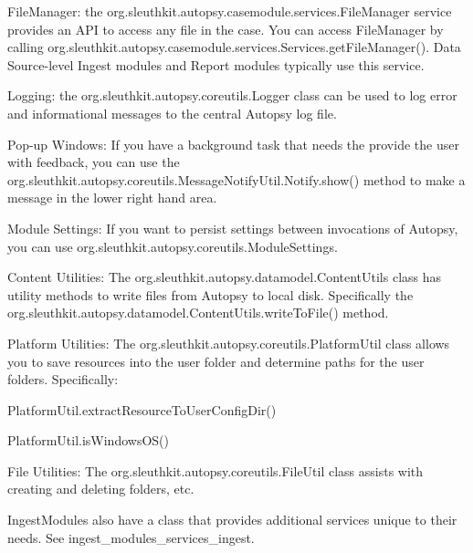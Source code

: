 \begin{DoxyItemize}
\item File\+Manager\+: the org.\+sleuthkit.\+autopsy.\+casemodule.\+services.\+File\+Manager service provides an A\+PI to access any file in the case. You can access File\+Manager by calling org.\+sleuthkit.\+autopsy.\+casemodule.\+services.\+Services.\+get\+File\+Manager(). Data Source-\/level Ingest modules and Report modules typically use this service.
\item Logging\+: the org.\+sleuthkit.\+autopsy.\+coreutils.\+Logger class can be used to log error and informational messages to the central Autopsy log file.
\item Pop-\/up Windows\+: If you have a background task that needs the provide the user with feedback, you can use the org.\+sleuthkit.\+autopsy.\+coreutils.\+Message\+Notify\+Util.\+Notify.\+show() method to make a message in the lower right hand area.
\item Module Settings\+: If you want to persist settings between invocations of Autopsy, you can use org.\+sleuthkit.\+autopsy.\+coreutils.\+Module\+Settings.
\item Content Utilities\+: The org.\+sleuthkit.\+autopsy.\+datamodel.\+Content\+Utils class has utility methods to write files from Autopsy to local disk. Specifically the org.\+sleuthkit.\+autopsy.\+datamodel.\+Content\+Utils.\+write\+To\+File() method.
\item Platform Utilities\+: The org.\+sleuthkit.\+autopsy.\+coreutils.\+Platform\+Util class allows you to save resources into the user folder and determine paths for the user folders. Specifically\+:
\begin{DoxyItemize}
\item Platform\+Util.\+extract\+Resource\+To\+User\+Config\+Dir()
\item Platform\+Util.\+is\+Windows\+O\+S()
\end{DoxyItemize}
\item File Utilities\+: The org.\+sleuthkit.\+autopsy.\+coreutils.\+File\+Util class assists with creating and deleting folders, etc.
\item Ingest\+Modules also have a class that provides additional services unique to their needs. See ingest\+\_\+modules\+\_\+services\+\_\+ingest. 
\end{DoxyItemize}